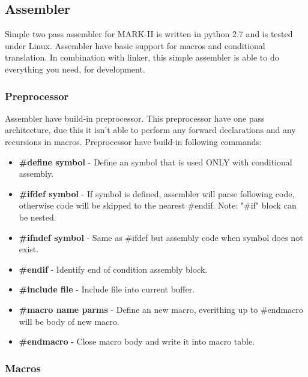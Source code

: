 \subsection{Assembler}

Simple two pass assembler for MARK-II is written in python 2.7 and is tested
under Linux. Assembler have basic support for macros and conditional translation.
In combination with linker, this simple assembler is able to do everything you
need, for development.

\subsubsection{Preprocessor}

Assembler have build-in preprocessor. This preprocessor have one pass
architecture, due this it isn't able to perform any forward declarations and any
recursions in macros. Preprocessor have build-in following commands:

\begin{itemize}
    \item \textbf{\#define symbol} -
    Define an symbol that is used ONLY with conditional assembly.

    \item \textbf{\#ifdef symbol} -
    If symbol is defined, assembler will parse following code, otherwise code
    will be skipped to the nearest \#endif. Note: "\#if" block can be nested.

    \item \textbf{\#ifndef symbol} -
    Same as \#ifdef but assembly code when symbol does not exist.

    \item \textbf{\#endif} -
    Identify end of condition assembly block.

    \item \textbf{\#include file} -
    Include file into current buffer.

    \item \textbf{\#macro name parms} -
    Define an new macro, everithing up to \#endmacro will be body of new macro.

    \item \textbf{\#endmacro} -
    Close macro body and write it into macro table.
\end{itemize}

\subsubsection{Macros}

